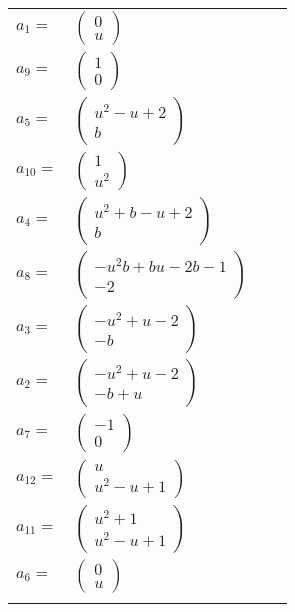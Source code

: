 \documentclass[1p]{elsarticle_modified}
\theoremstyle{definition}
\begin{document}
\begin{tabular}{m{7pt} m{180pt} m{7pt} m{180pt} }
\flushright $a_{1}=$&$\begin{pmatrix}0\\u\end{pmatrix}$ \\
\flushright $a_{9}=$&$\begin{pmatrix}1\\0\end{pmatrix}$ \\
\flushright $a_{5}=$&$\begin{pmatrix}u^2- u+2\\b\end{pmatrix}$ \\
\flushright $a_{10}=$&$\begin{pmatrix}1\\u^2\end{pmatrix}$ \\
\flushright $a_{4}=$&$\begin{pmatrix}u^2+b- u+2\\b\end{pmatrix}$ \\
\flushright $a_{8}=$&$\begin{pmatrix}- u^2 b+b u-2 b-1\\-2\end{pmatrix}$ \\
\flushright $a_{3}=$&$\begin{pmatrix}- u^2+u-2\\- b\end{pmatrix}$ \\
\flushright $a_{2}=$&$\begin{pmatrix}- u^2+u-2\\- b+u\end{pmatrix}$ \\
\flushright $a_{7}=$&$\begin{pmatrix}-1\\0\end{pmatrix}$ \\
\flushright $a_{12}=$&$\begin{pmatrix}u\\u^2- u+1\end{pmatrix}$ \\
\flushright $a_{11}=$&$\begin{pmatrix}u^2+1\\u^2- u+1\end{pmatrix}$ \\
\flushright $a_{6}=$&$\begin{pmatrix}0\\u\end{pmatrix}$\\&\end{tabular}
\end{document}
